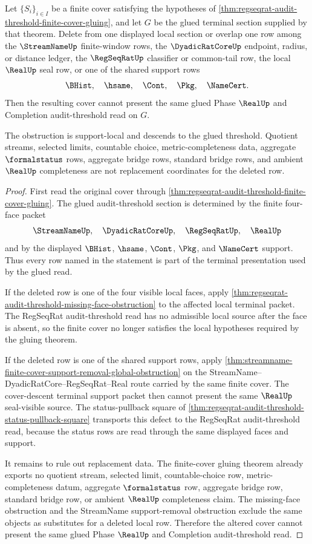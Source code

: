 \begin{theorem}
\label{thm:regseqrat-audit-threshold-support-removal-descent}
Let $\{S_i\}_{i \in I}$ be a finite cover satisfying the hypotheses of \autoref{thm:regseqrat-audit-threshold-finite-cover-gluing}, and let $G$ be the glued terminal section supplied by that theorem. Delete from one displayed local section or overlap one row among the $\StreamNameUp$ finite-window rows, the $\DyadicRatCoreUp$ endpoint, radius, or distance ledger, the $\RegSeqRatUp$ classifier or common-tail row, the local $\RealUp$ seal row, or one of the shared support rows
$$
\BHist,\quad \hsame,\quad \Cont,\quad \Pkg,\quad \NameCert.
$$
Then the resulting cover cannot present the same glued Phase $\RealUp$ and Completion audit-threshold read on $G$.

The obstruction is support-local and descends to the glued threshold. Quotient streams, selected limits, countable choice, metric-completeness data, aggregate $\formalstatus$ rows, aggregate bridge rows, standard bridge rows, and ambient $\RealUp$ completeness are not replacement coordinates for the deleted row.
\end{theorem}
\begin{proof}
First read the original cover through \autoref{thm:regseqrat-audit-threshold-finite-cover-gluing}. The glued audit-threshold section is determined by the finite four-face packet
$$
\StreamNameUp,\quad \DyadicRatCoreUp,\quad \RegSeqRatUp,\quad \RealUp
$$
and by the displayed $\BHist$, $\hsame$, $\Cont$, $\Pkg$, and $\NameCert$ support. Thus every row named in the statement is part of the terminal presentation used by the glued read.

If the deleted row is one of the four visible local faces, apply \autoref{thm:regseqrat-audit-threshold-missing-face-obstruction} to the affected local terminal packet. The RegSeqRat audit-threshold read has no admissible local source after the face is absent, so the finite cover no longer satisfies the local hypotheses required by the gluing theorem.

If the deleted row is one of the shared support rows, apply \autoref{thm:streamname-finite-cover-support-removal-global-obstruction} on the StreamName--DyadicRatCore--RegSeqRat--Real route carried by the same finite cover. The cover-descent terminal support packet then cannot present the same $\RealUp$ seal-visible source. The status-pullback square of \autoref{thm:regseqrat-audit-threshold-status-pullback-square} transports this defect to the RegSeqRat audit-threshold read, because the status rows are read through the same displayed faces and support.

It remains to rule out replacement data. The finite-cover gluing theorem already exports no quotient stream, selected limit, countable-choice row, metric-completeness datum, aggregate $\formalstatus$ row, aggregate bridge row, standard bridge row, or ambient $\RealUp$ completeness claim. The missing-face obstruction and the StreamName support-removal obstruction exclude the same objects as substitutes for a deleted local row. Therefore the altered cover cannot present the same glued Phase $\RealUp$ and Completion audit-threshold read.
\end{proof}

